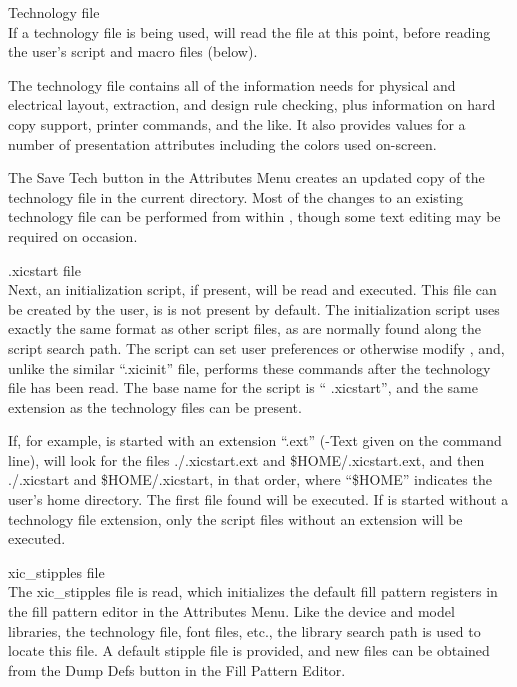 \begin{description}
\item{Technology file}\\
If a technology file is being used, {\Xic} will read the file at this
point, before reading the user's script and macro files (below).

The technology file contains all of the information {\Xic} needs for
physical and electrical layout, extraction, and design rule checking,
plus information on hard copy support, printer commands, and the like. 
It also provides values for a number of presentation attributes
including the colors used on-screen.

The {\cb Save Tech} button in the {\cb Attributes Menu} creates an
updated copy of the technology file in the current directory.  Most of
the changes to an existing technology file can be performed from
within {\Xic}, though some text editing may be required on occasion.

\item{{\vt .xicstart} file}\\
Next, an initialization script, if present, will be read and executed. 
This file can be created by the user, is is not present by default. 
The initialization script uses exactly the same format as other script
files, as are normally found along the script search path.  The script
can set user preferences or otherwise modify {\Xic}, and, unlike the
similar ``{\vt .xicinit}'' file, performs these commands after the
technology file has been read.  The base name for the script is ``{\vt
.xicstart}'', and the same extension as the technology files can be
present.

If, for example, {\Xic} is started with an extension ``{\vt .ext}''
({\vt -Text} given on the command line), {\Xic} will look for the
files {\vt ./.xicstart.ext} and {\vt \$HOME/.xicstart.ext}, and then
{\vt ./.xicstart} and {\vt \$HOME/.xicstart}, in that order, where
``{\vt \$HOME}'' indicates the user's home directory.  The first file
found will be executed.  If {\Xic} is started without a technology
file extension, only the script files without an extension will be
executed.

\item{{\vt xic\_stipples} file}\\
The {\vt xic\_stipples} file is read, which initializes the default
fill pattern registers in the fill pattern editor in the {\cb
Attributes Menu}.  Like the device and model libraries, the technology
file, font files, etc., the library search path is used to locate this
file.  A default stipple file is provided, and new files can be
obtained from the {\cb Dump Defs} button in the {\cb Fill Pattern
Editor}.


\end{description}
